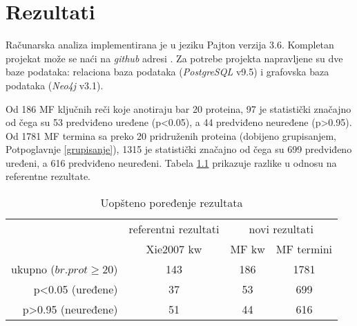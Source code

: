 
\chapter{Rezultati} %

\label{Rezultati} %

Računarska analiza implementirana je u jeziku Pajton  verzija 3.6.
Kompletan projekat može se naći na \textit{github} adresi \cite{projekat}. Za
potrebe projekta napravljene su dve baze podataka: relaciona baza podataka
(\textit{PostgreSQL} v9.5) i grafovska baza podataka (\textit{Neo4j} v3.1).

Od 186 MF ključnih reči koje anotiraju bar 20 proteina, 97 je statistički
značajno od čega su 53 predviđeno uređene (p<0.05), a 44 predviđeno neuređene
(p>0.95).  Od 1781 MF termina sa preko 20 pridruženih proteina (dobijeno
grupisanjem, Potpoglavnje \ref{grupisanje}), 1315 je statistički značajno od
čega su 699 predviđeno uređeni, a 616 predviđeno neuređeni.  Tabela
\ref{tab:kw_uopsteno} prikazuje razlike u odnosu na referentne rezultate.

\begin{table}[htpb]
\begin{tabular}{|r|c|c|c|}
  \hline
                     & \small referentni rezultati  & \multicolumn{2}{c|}{ novi rezultati} \\
                     & Xie2007 kw & MF kw  & MF termini                  \\
  \hline
  ukupno ($br. prot\ge20$)     & 143        & 186    & 1781                        \\
  p<0.05 (uređene)   & 37         & 53     & 699                         \\
  p>0.95 (neuređene) & 51         & 44     & 616                         \\
  \hline
\end{tabular}
  \centering
  \caption{Uopšteno poređenje rezultata}
  \label{tab:kw_uopsteno}
\end{table}

